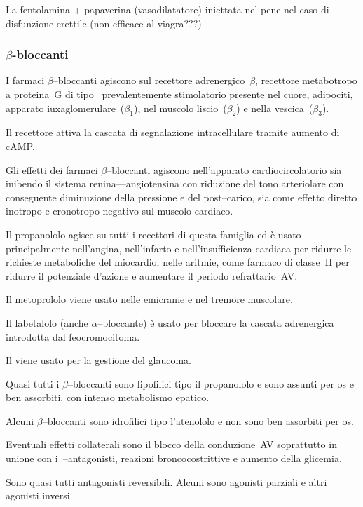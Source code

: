 La fentolamina + papaverina (vasodilatatore) iniettata nel pene nel caso di disfunzione erettile (non efficace al viagra???)

\subsubsection{$\beta$-bloccanti}

I farmaci $\beta$--bloccanti agiscono sul recettore adrenergico~$\beta$, recettore metabotropo a proteina~G di tipo~ prevalentemente stimolatorio presente nel cuore, adipociti, apparato iuxaglomerulare~($\beta_1$), nel muscolo liscio~($\beta_2$) e nella vescica~($\beta_3$).

Il recettore attiva la cascata di segnalazione intracellulare tramite aumento di cAMP.

Gli effetti dei farmaci $\beta$--bloccanti agiscono nell'apparato cardiocircolatorio sia inibendo il sistema renina---angiotensina con riduzione del tono arteriolare con conseguente diminuzione della pressione e del post--carico, sia come effetto diretto inotropo e cronotropo negativo sul muscolo cardiaco.

Il propanololo agisce su tutti i recettori di questa famiglia ed è usato principalmente nell'angina, nell'infarto e nell'insufficienza cardiaca per ridurre le richieste metaboliche del miocardio, nelle aritmie, come farmaco di classe~II per ridurre il potenziale d'azione e aumentare il periodo refrattario~AV.

Il metoprololo viene usato nelle emicranie e nel tremore muscolare.

Il labetalolo (anche $\alpha$--bloccante) è usato per bloccare la cascata adrenergica introdotta dal feocromocitoma.

Il  viene usato per la gestione del glaucoma.

Quasi tutti i $\beta$--bloccanti sono lipofilici tipo il propanololo e sono assunti per os e ben assorbiti, con intenso metabolismo epatico.

Alcuni $\beta$--bloccanti sono idrofilici tipo l'atenololo e non sono ben assorbiti per os. 

Eventuali effetti collaterali sono il blocco della conduzione~AV soprattutto in unione con i~--antagonisti, reazioni broncocostrittive e aumento della glicemia.

Sono quasi tutti antagonisti reversibili. Alcuni sono agonisti parziali e altri agonisti inversi. 


